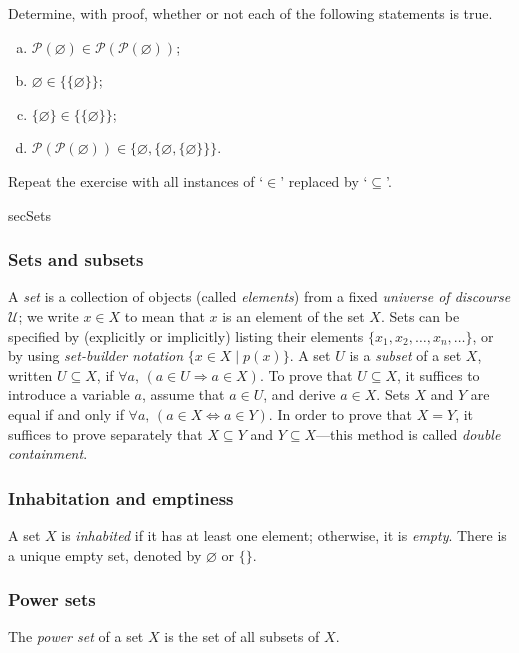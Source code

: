 \begin{exercise}
Determine, with proof, whether or not each of the following statements is true.
\begin{enumerate}[(a)]
\item $\mathcal{P}(\varnothing) \in \mathcal{P}(\mathcal{P}(\varnothing))$;
\item $\varnothing \in \{ \{ \varnothing \} \}$;
\item $\{ \varnothing \} \in \{ \{ \varnothing \} \}$;
\item $\mathcal{P}(\mathcal{P}(\varnothing)) \in \{ \varnothing, \{ \varnothing, \{ \varnothing \} \} \}$.
\end{enumerate}
Repeat the exercise with all instances of `$\in$' replaced by `$\subseteq$'.
\end{exercise}

\begin{tldr}{secSets}

\subsubsection*{Sets and subsets}

\begin{tldrlist}
 A \textit{set} is a collection of objects (called \textit{elements}) from a fixed \textit{universe of discourse} $\mathcal{U}$; we write $x \in X$ to mean that $x$ is an element of the set $X$. Sets can be specified by (explicitly or implicitly) listing their elements $\{ x_1, x_2, \dots, x_n, \dots \}$, or by using \textit{set-builder notation} $\{ x \in X \mid p(x) \}$.
 A set $U$ is a \textit{subset} of a set $X$, written $U \subseteq X$, if $\forall a,\, (a \in U \Rightarrow a \in X)$. To prove that $U \subseteq X$, it suffices to introduce a variable $a$, assume that $a \in U$, and derive $a \in X$.
 Sets $X$ and $Y$ are equal if and only if $\forall a,\, (a \in X \Leftrightarrow a \in Y)$. In order to prove that $X = Y$, it suffices to prove separately that $X \subseteq Y$ and $Y \subseteq X$---this method is called \textit{double containment}.
\end{tldrlist}

\subsubsection*{Inhabitation and emptiness}

\begin{tldrlist}
 A set $X$ is \textit{inhabited} if it has at least one element; otherwise, it is \textit{empty}.
 There is a unique empty set, denoted by $\varnothing$ or $\{ \}$.
\end{tldrlist}

\subsubsection*{Power sets}
\begin{tldrlist}
 The \textit{power set} of a set $X$ is the set of all subsets of $X$.
\end{tldrlist}
\end{tldr}